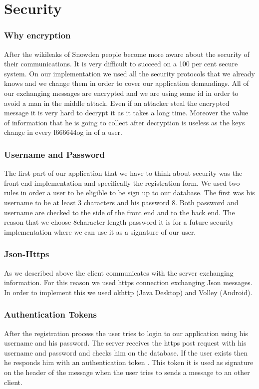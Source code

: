 \documentclass[11pt,a4paper]{report}
\begin{document}
\section{Security}
\subsubsection{Why encryption}
After the wikileaks of Snowden people become more aware about the security of their communications. It is very difficult to succeed on a 100 per cent secure system. On our implementation we used all the security protocols that we already knows and we change them in order to cover our application demandings. All of our exchanging messages are encrypted and we are using some id in order to avoid a man in the middle attack. Even if an attacker steal the encrypted message it is very hard to decrypt it as it takes a long time. Moreover the value of information that he is going to collect after decryption is useless as the keys change in every l666644og in of a user.
\subsubsection{Username and Password}
The first part of our application that we have to think about security was the front end implementation and specifically the registration form. We used two rules in order a user to be eligible to be sign up to our database. The first was his username to be at least 3 characters and his password 8. Both password and username are checked to the side of the front end and to the back end. The reason that we choose 8character length password it is for a future security implementation where we can use it as a signature of our user.
\subsubsection{Json-Https}
As we described above the client communicates with the server exchanging information. For this reason we used https connection exchanging Json messages. In order to implement this we used okhttp (Java Desktop) and Volley (Android).
\subsubsection{Authentication Tokens}
After the registration process the user tries to login to our application using his username and his password. The server receives the https post request with his username and password and checks him on the database. If the user exists then he responds him with an authentication token .  This token it is used as signature on the header of the message when the user tries to sends a message to an other client.
\end{document}
